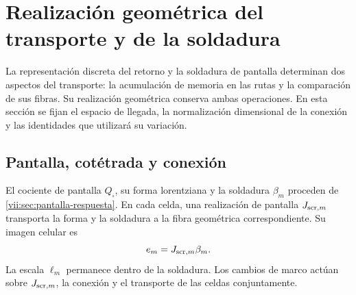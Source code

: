 
\section{Realización geométrica del transporte y de la soldadura}
\label{vii:sec:realizacion-cartan}

La representación discreta del retorno y la soldadura de pantalla
determinan dos aspectos del transporte: la acumulación de memoria en
las rutas y la comparación de sus fibras. Su realización geométrica
conserva ambas operaciones. En esta sección se fijan el espacio de
llegada, la normalización dimensional de la conexión y las identidades
que utilizará su variación.

\subsection{Pantalla, cotétrada y conexión}

El cociente de pantalla \(Q_\square\), su forma lorentziana y la
soldadura \(\beta_m\) proceden de
\ref{vii:sec:pantalla-respuesta}. En cada celda, una realización de
pantalla \(J_{{\rm scr},m}\) transporta la forma y la soldadura
a la fibra geométrica correspondiente. Su imagen celular es
\[
 e_m=J_{{\rm scr},m}\beta_m.
\]
La escala \(\ell_m\) permanece dentro de la soldadura. Los
cambios de marco actúan sobre \(J_{{\rm scr},m}\), la conexión
y el transporte de las celdas conjuntamente.

